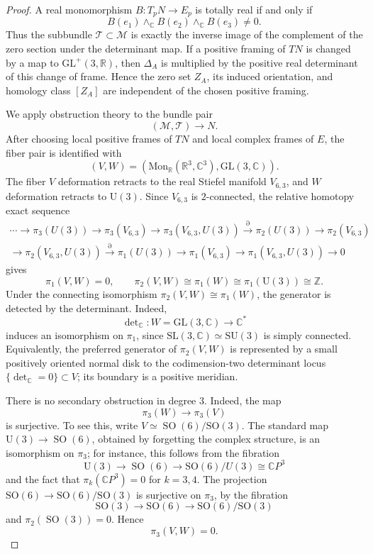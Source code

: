 \documentclass[12pt]{amsart}
\theoremstyle{definition}
\newcommand{\C}{\mathbb{C}}
\newcommand{\Z}{\mathbb{Z}}
\newcommand{\R}{\mathbb{R}}
\newcommand{\Gl}{{\mathrm{GL}}}
\newcommand{\Sl}{{\mathrm{SL}}}
\newcommand{\Su}{{\mathrm{SU}}}
\newcommand{\U}{{\mathrm{U}}}
\newcommand{\So}{{\mathrm{SO}}}
\newcommand{\cM}{\mathcal{M}}
\newcommand{\cT}{\mathcal{T}}
\newcommand\Mon{\mathrm{Mon}}
\numberwithin{equation}{section}
\begin{document}
\begin{proof}
A real monomorphism \(B:T_pN\to E_p\) is totally real if and only if 
\[B(e_1)\wedge_{\C}B(e_2)\wedge_{\C}B(e_3)\ne 0.\] 
Thus the subbundle \(\cT\subset \cM\) is exactly the inverse image of the complement of the zero section under the determinant map. If a positive framing of $TN$ is changed by a map to $\Gl^+(3,\R)$, then $\Delta_A$ is multiplied by the positive real determinant of this change of frame. Hence the zero set $Z_A$, its induced orientation, and homology class $[Z_A]$ 
are independent of the chosen positive framing.

We apply obstruction theory to the bundle pair
\[(\cM,\cT)\longrightarrow N.\]
After choosing local positive frames of $TN$ and local complex frames of $E$, the fiber pair is identified with 
\[(V,W)=\left(\Mon_{\R}(\R^3,\C^3),\Gl(3,\C)\right).\]
The fiber $V$ deformation retracts to the real Stiefel manifold $V_{6,3}$, and $W$ deformation retracts to $\U(3)$. 
Since $V_{6,3}$ is $2$-connected, the relative homotopy exact sequence 
\begin{equation*}	
\begin{split}	
\cdots \longrightarrow
\pi_3(U(3))
\longrightarrow
\pi_3(V_{6,3})
\longrightarrow
\pi_3(V_{6,3},U(3))
\overset{\partial}{\longrightarrow}
\pi_2(U(3))
\longrightarrow
\pi_2(V_{6,3})\\
\longrightarrow
\pi_2(V_{6,3},U(3))
\overset{\partial}{\longrightarrow}
\pi_1(U(3))
\longrightarrow
\pi_1(V_{6,3})
\longrightarrow
\pi_1(V_{6,3},U(3))
\longrightarrow
0
\end{split}
\end{equation*}
gives
\[\pi_1(V,W)=0, \qquad \pi_2(V,W)\cong \pi_1(W)\cong \pi_1(\U(3))\cong \Z.\]
Under the connecting isomorphism $\pi_2(V,W)\cong \pi_1(W)$, the generator is detected by the determinant. Indeed,
\[\det\nolimits_{\C}:W=\Gl(3,\C)\longrightarrow \C^*\]
induces an isomorphism on $\pi_1$, since $\Sl (3,\C)\simeq \Su(3)$ is simply connected. Equivalently, the preferred generator of \(\pi_2(V,W)\) is represented by a small positively oriented normal disk to the codimension-two determinant locus $\{\det\nolimits_{\C}=0\}\subset V$; its boundary is a positive meridian.

There is no secondary obstruction in degree $3$. Indeed, the map 
\[\pi_3(W)\longrightarrow \pi_3(V)\]
is surjective. To see this, write $V\simeq \operatorname{SO}(6)/\So(3)$. The standard map $\U(3)\to \operatorname{SO}(6)$, obtained by forgetting the complex structure, is an isomorphism on $\pi_3$; for instance, this follows from the fibration
\[\U(3)\longrightarrow \operatorname{SO}(6)\longrightarrow \So(6)/U(3)
        \cong \C P^3\]
and the fact that $\pi_k(\mathbb{C}P^3)=0$ for $k=3,4$. The projection $\So(6)\to \So(6)/\So(3)$ is surjective on $\pi_3$, by the fibration
\[\So(3)\longrightarrow \So(6)\longrightarrow \So(6)/\So(3)\]
and $\pi_2(\operatorname{SO}(3))=0$. Hence
\[\pi_3(V,W)=0 .\]


\end{proof}
\end{document}
